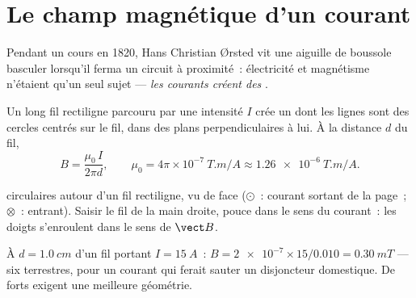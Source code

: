 \section{Le champ magnétique d'un courant}

\begin{remark}[Ørsted, 1820]\label{rem:g11:magnetic-fields:oersted}
Pendant un cours en 1820, Hans Christian Ørsted vit une aiguille de
boussole basculer lorsqu'il ferma un circuit à proximité~: électricité
et magnétisme n'étaient qu'un seul sujet --- \emph{les courants créent
des }.
\end{remark}

\begin{proposition}\label{prop:g11:magnetic-fields:wire}
Un long fil rectiligne parcouru par une intensité $I$ crée un
 dont les lignes sont des
cercles centrés sur le fil, dans des plans perpendiculaires à lui. À la
distance $d$ du fil,
\[
B = \frac{\mu_0\, I}{2\pi d},
\qquad \mu_0 = 4\pi\times 10^{-7}\ \unit{T.m/A} \approx \qty{1.26e-6}{T.m/A}.
\]
\end{proposition}
\admitted

\begin{omfigure}
\qquad\qquad
{}

{\small {} circulaires
autour d'un fil rectiligne, vu de face ($\odot$~: courant sortant de la
page~; $\otimes$~: entrant). Saisir le fil de la main droite, pouce
dans le sens du courant~: les doigts s'enroulent dans le sens de
$\vect B$.}
\end{omfigure}

\begin{example}\label{ex:g11:magnetic-fields:wire}
À $d = \qty{1.0}{cm}$ d'un fil portant $I = \qty{15}{A}$~:
$B = \num{2e-7} \times 15 / 0.010 = \qty{0.30}{mT}$ --- six
 terrestres, pour un courant
qui ferait sauter un disjoncteur domestique. De forts
 exigent une meilleure
géométrie.
\end{example}

